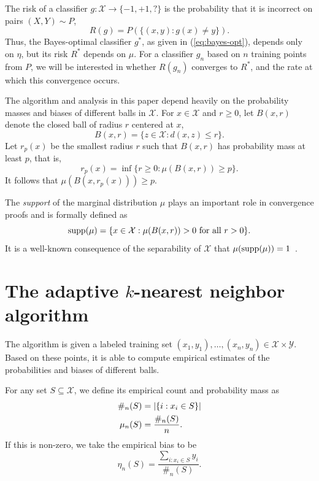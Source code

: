 \documentclass{article}
\def\X{{\mathcal X}}
\def\Y{{\mathcal Y}}
\def\supp{{\rm supp}}
\begin{document}
The risk of a classifier $g: \X \rightarrow \{-1,+1,?\}$ is the probability that it is incorrect on pairs $(X,Y) \sim P$,
\begin{equation}
R(g) = P(\{(x,y): g(x) \neq y\}).
\label{eq:risk}
\end{equation}
Thus, the Bayes-optimal classifier $g^*$, as given in (\ref{eq:bayes-opt}), depends only on $\eta$, but its risk $R^*$ depends on $\mu$. For a classifier $g_n$ based on $n$ training points from $P$, we will be interested in whether $R(g_n)$ converges to $R^*$, and the rate at which this convergence occurs.

The algorithm and analysis in this paper depend heavily on the probability masses and biases of different balls in $\X$. For $x \in \X$ and $r \geq 0$, let $B(x,r)$ denote the closed ball of radius $r$ centered at $x$, 
$$ B(x,r) = \{ z \in \X : d(x,z) \leq r \} .$$
Let $r_p(x)$ be the smallest radius $r$ such that $B(x,r)$ has probability mass at least $p$, that is,
\begin{equation}
r_p(x) = \inf \{r \geq 0: \mu(B(x,r)) \geq p \}.
\label{eq:probability-radius}
\end{equation}
It follows that $\mu(B(x,r_p(x))) \geq p$.

The {\it support} of the marginal distribution $\mu$ plays an important role in convergence proofs and is formally defined as
$$ \supp(\mu) = \{x \in \X: \mbox{$\mu(B(x,r)) > 0$ for all $r > 0$}\} .$$
It is a well-known consequence of the separability of $\X$ that $\mu(\supp(\mu)) = 1$~\cite{CH67}.



\section{The adaptive $k$-nearest neighbor algorithm}

The algorithm is given a labeled training set
$(x_1, y_1), \ldots, (x_n, y_n) \in \X \times \Y$.
Based on these points, it is able to compute empirical estimates of the probabilities and biases of different balls.

For any set $S \subseteq \X$, we define its empirical count and probability mass as
\begin{align}
\notag \#_n(S) &= |\{i: x_i \in S\}| \\
\mu_n(S) &= \frac{\#_n(S)}{n} .
\label{eq:empirical-mass}
\end{align}
If this is non-zero, we take the empirical bias to be
\begin{equation}
\eta_n(S) = \frac{\sum_{i: x_i \in S} y_i}{\#_n(S)} .
\label{eq:empirical-bias}
\end{equation}
\end{document}
